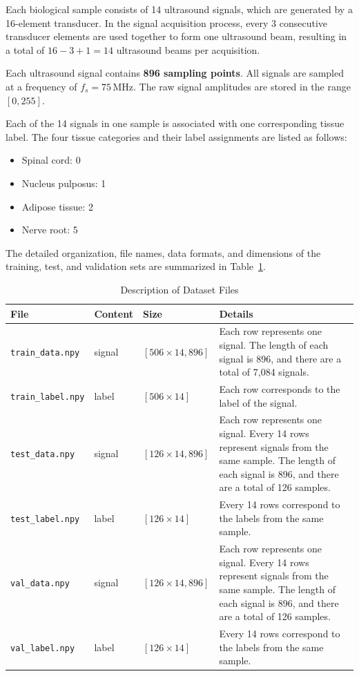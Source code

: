 \documentclass[11pt]{article}
\begin{document}
Each biological sample consists of 14 ultrasound signals, which are generated by a 16-element transducer. In the signal acquisition process, every 3 consecutive transducer elements are used together to form one ultrasound beam, resulting in a total of $16-3+1=14$ ultrasound beams per acquisition.

Each ultrasound signal contains \textbf{896 sampling points}. All signals are sampled at a frequency of $f_s=75\,\text{MHz}$. The raw signal amplitudes are stored in the range $[0,255]$.

Each of the 14 signals in one sample is associated with one corresponding tissue label. The four tissue categories and their label assignments are listed as follows:

\begin{itemize}
    \item Spinal cord: 0
    \item Nucleus pulposus: 1
    \item Adipose tissue: 2
    \item Nerve root: 5
\end{itemize}

The detailed organization, file names, data formats, and dimensions of the training, test, and validation sets are summarized in Table~\ref{tab:dataset}.

\begin{table}[htbp]
\centering
\caption{Description of Dataset Files}
\label{tab:dataset}
\small
\begin{tabular}{@{}p{}p{}p{}p{}@{}}
\toprule
\textbf{File} & \textbf{Content} & \textbf{Size} & \textbf{Details} \\
\midrule
\texttt{train\_data.npy} & signal & $[506\times14,896]$ & Each row represents one signal. The length of each signal is 896, and there are a total of 7,084 signals. \\
\addlinespace
\texttt{train\_label.npy} & label & $[506\times14]$ & Each row corresponds to the label of the signal. \\
\addlinespace
\texttt{test\_data.npy} & signal & $[126\times14,896]$ & Each row represents one signal. Every 14 rows represent signals from the same sample. The length of each signal is 896, and there are a total of 126 samples. \\
\addlinespace
\texttt{test\_label.npy} & label & $[126\times14]$ & Every 14 rows correspond to the labels from the same sample. \\
\addlinespace
\texttt{val\_data.npy} & signal & $[126\times14,896]$ & Each row represents one signal. Every 14 rows represent signals from the same sample. The length of each signal is 896, and there are a total of 126 samples. \\
\addlinespace
\texttt{val\_label.npy} & label & $[126\times14]$ & Every 14 rows correspond to the labels from the same sample. \\
\bottomrule
\end{tabular}
\end{table}
\end{document}
